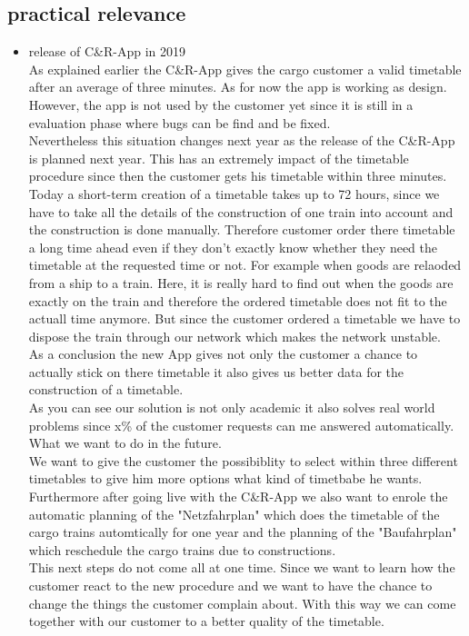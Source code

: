 \subsection{practical relevance}
\begin{itemize}
  \item release of C\&R-App in 2019 \\
  As explained earlier the C\&R-App gives the cargo customer a valid timetable after an average of three minutes. As for now the app is working as design. However, the app is not used by the customer yet since it is still in a evaluation phase where bugs can be find and be fixed. \\
  Nevertheless this situation changes next year as the release of the C\&R-App is planned next year. This has an extremely impact of the timetable procedure since then the customer gets his timetable within three minutes. Today a short-term creation of a timetable takes up to 72
  hours, since we have to take all the details of the construction of one train into account and the construction is done manually. Therefore customer order there timetable a long time ahead even if they don't exactly know whether they need the timetable at the requested time or not. For example when goods are relaoded from a ship to a train. Here, it is really hard to find out when the goods are exactly on the train and therefore the ordered timetable does not fit to the actuall time anymore. But since the customer ordered a timetable we have to dispose the train through our network which makes the network unstable. \\
  As a conclusion the new App gives not only the customer a chance to actually stick on there timetable it also gives us better data for the construction of a timetable. \\
  As you can see our solution is not only academic it also solves real world problems since x\% of the customer requests can me answered automatically. \\
  
  What we want to do in the future. \\
  We want to give the customer the possibiblity to select within three different timetables to give him more options what kind of timetbabe he wants. \\
  Furthermore after going live with the C\&R-App we also want to enrole the automatic planning of the "Netzfahrplan" which does the timetable of the cargo trains automtically for one year and the planning of the "Baufahrplan" which reschedule the cargo trains due to constructions. \\
  This next steps do not come all at one time. Since we want to learn how the customer react to the new procedure and we want to have the chance to change the things the customer complain about. With this way we can come together with our customer to a better quality of the timetable. \\
  

\end{itemize}
